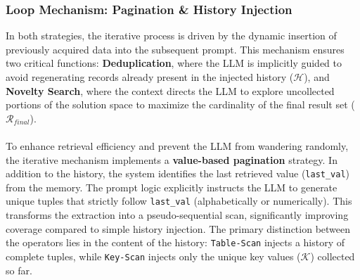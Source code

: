 \subsubsection{Loop Mechanism: Pagination \& History Injection}
In both strategies, the iterative process is driven by the dynamic insertion of previously acquired data into the subsequent prompt. This mechanism ensures two critical functions: \textbf{Deduplication}, where the LLM is implicitly guided to avoid regenerating records already present in the injected history ($\mathcal{H}$), and \textbf{Novelty Search}, where the context directs the LLM to explore uncollected portions of the solution space to maximize the cardinality of the final result set ($\mathcal{R}_{final}$).
\\\\
To enhance retrieval efficiency and prevent the LLM from wandering randomly, the iterative mechanism implements a \textbf{value-based pagination} strategy. In addition to the history, the system identifies the last retrieved value (\texttt{last\_val}) from the memory. The prompt logic explicitly instructs the LLM to generate unique tuples that strictly follow \texttt{last\_val} (alphabetically or numerically). This transforms the extraction into a pseudo-sequential scan, significantly improving coverage compared to simple history injection. The primary distinction between the operators lies in the content of the history: \texttt{Table-Scan} injects a history of complete tuples, while \texttt{Key-Scan} injects only the unique key values ($\mathcal{K}$) collected so far.

